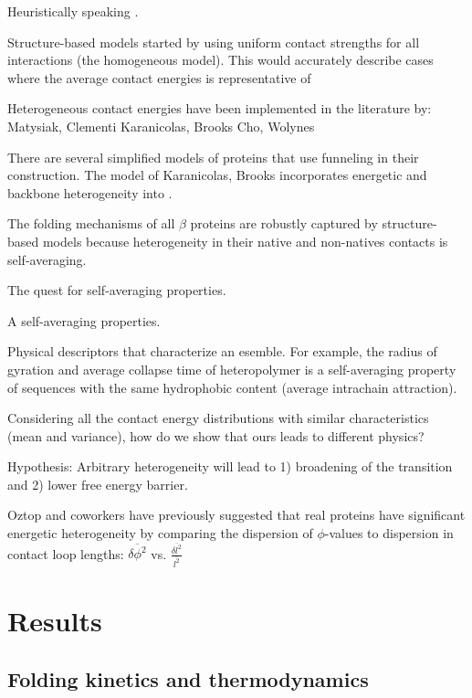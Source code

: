 \documentclass[preprint]{elsarticle}
\begin{document}
\cite{Clementi2000}
\cite{Matysiak2004}
\cite{Matysiak2006}
\cite{Cho2009a}

Heuristically speaking .

Structure-based models started by using uniform contact strengths for all 
interactions (the homogeneous model). This would accurately describe cases
where the average contact energies is representative of 

\cite{Cho2009a}

Heterogeneous contact energies have been implemented in the literature by:
Matysiak, Clementi
Karanicolas, Brooks
Cho, Wolynes

    There are several simplified models of proteins that use funneling in their
construction. The model of Karanicolas, Brooks incorporates energetic and
backbone heterogeneity into . 

The folding mechanisms of all $\beta$ proteins are robustly captured by
structure-based models because heterogeneity in their native and non-natives
contacts is self-averaging. 

The quest for self-averaging properties.

A self-averaging properties.

Physical descriptors that characterize an esemble. For example, the radius of
gyration and average collapse time of heteropolymer is a self-averaging
property of sequences with the same hydrophobic content (average intrachain
attraction). 


Considering all the contact energy distributions with similar characteristics
(mean and variance), how do we show that ours leads to different physics?

Hypothesis: Arbitrary heterogeneity will lead to 1) broadening of the
transition and 2) lower free energy barrier.
\cite{Plotkin2002a}


    Oztop and coworkers \cite{Oztop2004} have previously suggested that real
proteins have significant energetic heterogeneity by comparing the dispersion
of $\phi$-values to dispersion in contact loop lengths:
$\overline{\delta\phi^2}$ vs. $\frac{\overline{\delta l^2}}{\overline{l^2}}$

\section{Results}

\subsection{Folding kinetics and thermodynamics}
\end{document}
